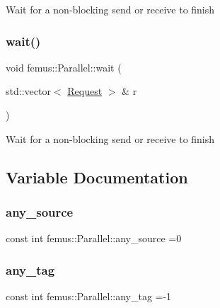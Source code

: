 Wait for a non-\/blocking send or receive to finish \mbox{\label{namespacefemus_1_1_parallel_afa71a836a79155d206fc4900be688460}} 
\subsubsection{\texorpdfstring{wait()}{wait()}\hspace{0.1cm}{\footnotesize\ttfamily [3/3]}}
{\footnotesize\ttfamily void femus\+::\+Parallel\+::wait (\begin{DoxyParamCaption}\item[{std\+::vector$<$ \mbox{\hyperlink{classfemus_1_1_parallel_1_1_request}{Request}} $>$ \&}]{r }\end{DoxyParamCaption})\hspace{0.3cm}{\ttfamily [inline]}}

Wait for a non-\/blocking send or receive to finish 

\subsection{Variable Documentation}
\mbox{\label{namespacefemus_1_1_parallel_a7a5a07efca1e4a2f4ef731d4a79703c5}} 
\subsubsection{\texorpdfstring{any\+\_\+source}{any\_source}}
{\footnotesize\ttfamily const int femus\+::\+Parallel\+::any\+\_\+source =0}

\mbox{\label{namespacefemus_1_1_parallel_a928996065f46cb52e89e132cdcb30328}} 
\subsubsection{\texorpdfstring{any\+\_\+tag}{any\_tag}}
{\footnotesize\ttfamily const int femus\+::\+Parallel\+::any\+\_\+tag =-\/1}


